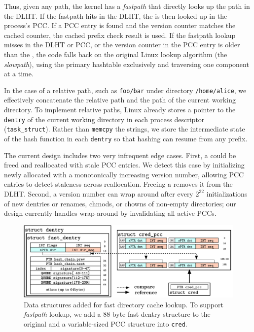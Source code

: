 Thus, given any path, the kernel
has a {\em fastpath} that directly looks up the path
in the DLHT.
If the fastpath hits in the DLHT,
the \dentry{} is then looked up in the process's PCC.
If a PCC entry is found and the version counter matches 
the cached counter, the cached prefix check result is used.
If the fastpath lookup misses in the DLHT or PCC, 
or the version counter in the PCC entry is older than the \dentry{}, 
the code falls back on the original 
Linux lookup algorithm (the {\em slowpath}),
using the primary hashtable exclusively and traversing one component at a time.

In the case of a relative path, such as {\tt foo/bar} under directory {\tt /home/alice},
we effectively concatenate the relative path and the path of the current working directory.
To implement relative paths, Linux already stores 
a pointer to the {\tt dentry} of the current working directory
in each process descriptor ({\tt task\_struct}).
Rather than {\tt memcpy} the strings, we store the intermediate state of the hash function 
in each {\tt dentry} so that hashing can resume from any prefix.

The current design includes two very infrequent edge cases.
First, a \dentry{} could be freed and reallocated with stale PCC entries.
We detect this case by initializing newly allocated \dentries{} with
a monotonically increasing version number,
allowing PCC entries to detect staleness across reallocation.
Freeing a \dentry{} removes it from the DLHT.
Second, a version number can wrap around after every $2^{32}$ initializations of new dentries or
renames, chmods, or chowns
of non-empty directories; 
our design currently handles wrap-around by invalidating all active PCCs.

\begin{figure}[t!]
\centering
\includegraphics[width=4.5in]{dcache/figures/dcache-data_structure.pdf}
\footnotesize
\caption[Directory cache optimization: Data structures added.]
{Data structures added for fast directory cache lookup. To support {\em fastpath} lookup, we add a 88-byte fast dentry structure to the original \dentry{} and a variable-sized PCC structure into {\tt cred}. 
}
\label{fig:dcache-data-structure}
\end{figure}

